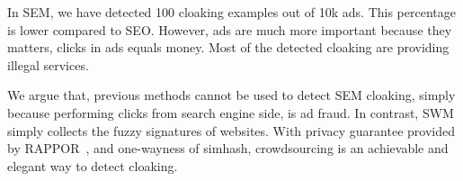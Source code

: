 In SEM, we have detected 100 cloaking examples out of 10k ads. This percentage
is lower compared to SEO. However, ads are much more important because they
matters, clicks in ads equals money. Most of the detected cloaking are providing
illegal services.

We argue that, previous methods cannot be used to detect SEM cloaking, simply
because performing clicks from search engine side, is ad fraud. In contrast,
SWM simply collects the fuzzy signatures of websites. With privacy guarantee
provided by RAPPOR~\cite{erlingsson2014rappor}, and one-wayness of simhash,
crowdsourcing is an achievable and elegant way to detect cloaking.

%


